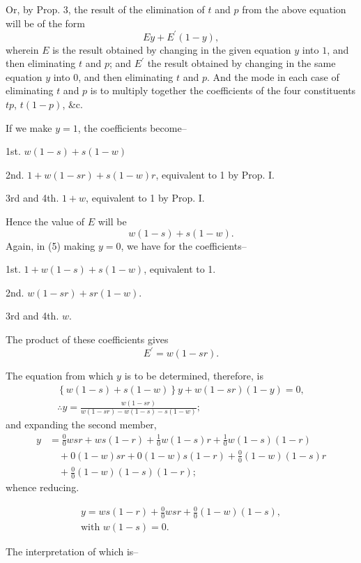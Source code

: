 \documentclass[oneside]{book}
\begin{document}
Or, by Prop. 3, the result of the elimination of $t$ and $p$ from the
above equation will be of the form
\[
Ey+E^\prime\left(1-y\right),
\]
wherein $E$ is the result obtained by changing in the given equation
$y$ into $1$, and then eliminating $t$ and $p$; and $E^\prime$ the result
obtained by changing in the same equation $y$ into $0$, and then
eliminating $t$ and $p$. And the mode in each case of eliminating $t$
and $p$ is to multiply together the coefficients of the four constituents
$tp$, $t\left(1-p\right)$, \&c.

If we make $y=1$, the coefficients become--

1st. $w\left(1-s\right)+s\left(1-w\right)$

2nd. $1+w\left(1-sr\right)+s\left(1-w\right)r$, equivalent to 1 by Prop. I.

3rd and 4th. $1 + w$, equivalent to 1 by Prop. I.

Hence the value of $E$ will be
\[
w\left(1-s\right) + s\left(1-w\right).
\]
Again, in (5) making $y = 0$, we have for the coefficients--

1st. $1+w\left(1-s\right) + s\left(1-w\right)$, equivalent to 1.

2nd. $w\left(1-sr\right) + sr\left(1-w\right)$.

3rd and 4th. $w$.

The product of these coefficients gives
\[
E^\prime=w\left(1-sr\right).
\]

The equation from which $y$ is to be determined, therefore, is
\begin{eqnarray*}
\left\{w(1-s)+s(1-w)\right\}y + w(1-sr)(1-y)=0,\\
\therefore y=\frac{w(1-sr)}{w(1-sr)-w(1-s)-s(1-w)};
\end{eqnarray*}
and expanding the second member,
\begin{eqnarray*}
y&=\frac{0}{0}wsr+ws(1-r)+\frac{1}{0}w(1-s)r+\frac{1}{0}w(1-s)(1-r)\\
&\quad+0(1-w)sr+0(1-w)s(1-r)+\frac{0}{0}(1-w)(1-s)r\\
&\quad+\frac{0}{0}(1-w)(1-s)(1-r);
\end{eqnarray*}
whence reducing.

\begin{eqnarray}
y=ws(1-r) + \frac{0}{0}wsr + \frac{0}{0}(1-w)(1-s),\\
\textrm{with }w (1-s) = 0.
\end{eqnarray}

The interpretation of which is--
\end{document}
